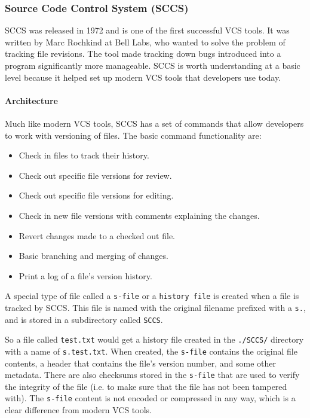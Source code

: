 \subsubsection{Source Code Control System (SCCS)}
SCCS was released in 1972 and is one of the first successful VCS tools. It was written by Marc Rochkind at Bell Labs, who wanted to solve the problem of tracking file revisions. The tool made tracking down bugs introduced into a program significantly more manageable. SCCS is worth understanding at a basic level because it helped set up modern VCS tools that developers use today.
\paragraph{Architecture}
Much like modern VCS tools, SCCS has a set of commands that allow developers to work with versioning of files. The basic command functionality are:
\begin{itemize}
    \item Check in files to track their history.
    \item Check out specific file versions for review.
    \item Check out specific file versions for editing.
    \item Check in new file versions with comments explaining the changes.
    \item Revert changes made to a checked out file.
    \item Basic branching and merging of changes.
    \item Print a log of a file's version history.
\end{itemize}
A special type of file called a \lstinline{s-file} or a \lstinline{history file} is created when a file is tracked by SCCS. This file is named with the original filename prefixed with a \lstinline{s.}, and is stored in a subdirectory called \lstinline{SCCS}.

So a file called \lstinline{test.txt} would get a history file created in the \lstinline{./SCCS/} directory with a name of \lstinline{s.test.txt}. When created, the \lstinline{s-file} contains the original file contents, a header that contains the file's version number, and some other metadata. There are also checksums stored in the \lstinline{s-file} that are used to verify the integrity of the file (i.e. to make sure that the file has not been tampered with). The \lstinline{s-file} content is not encoded or compressed in any way, which is a clear difference from modern VCS tools.

